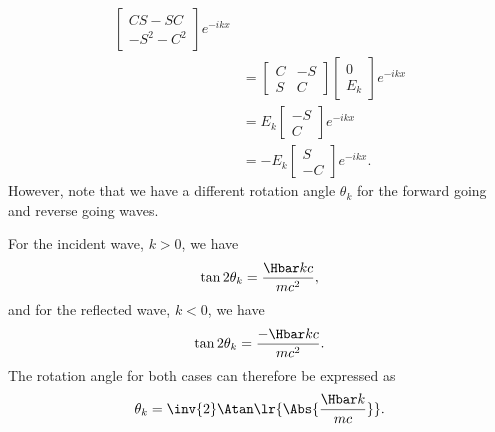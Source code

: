 {\begin{equation}
\begin{aligned}
\begin{bmatrix}
C S - S C \\
-S^2 - C^2
\end{bmatrix}
e^{-i k x}
\\ &=
\begin{bmatrix}
C & - S \\
S & C
\end{bmatrix}
\begin{bmatrix}
0 \\
E_k
\end{bmatrix}
e^{-i k x}
\\ &=
E_k
\begin{bmatrix}
- S \\
C
\end{bmatrix}
e^{-i k x}
\\ &=
-E_k
\begin{bmatrix}
S \\
-C
\end{bmatrix}
e^{-i k x}.
\end{aligned}
\end{equation}
%
However, note that we have a different rotation angle \( \theta_k \) for the forward going and reverse going waves.

For the incident wave, \( k > 0 \), we have
%
\begin{equation}\label{eqn:qmLecture9Problems:720}
\tan 2 \theta_k = \frac{ \Hbar k c }{ m c^2 },
\end{equation}
%
and for the reflected wave, \( k < 0 \), we have
%
\begin{equation}\label{eqn:qmLecture9Problems:740}
\tan 2 \theta_k = \frac{ -\Hbar k c }{ m c^2 }.
\end{equation}
%
The rotation angle for both cases can therefore be expressed as
%
\begin{equation}\label{eqn:qmLecture9Problems:760}
\theta_k = \inv{2} \Atan\lr{ \Abs{\frac{\Hbar k }{m c}} }.
\end{equation}
%
} %
%
%
